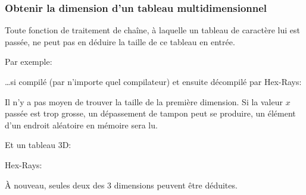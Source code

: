 \subsubsection{Obtenir la dimension d'un tableau multidimensionnel}

Toute fonction de traitement de chaîne, à laquelle un tableau de caractère lui est passée,
ne peut pas en déduire la taille de ce tableau en entrée.

Par exemple:



\dots si compilé (par n'importe quel compilateur) et ensuite décompilé par Hex-Rays:



Il n'y a pas moyen de trouver la taille de la première dimension.
Si la valeur $x$ passée est trop grosse, un dépassement de tampon peut se produire,
un élément d'un endroit aléatoire en mémoire sera lu.

Et un tableau 3D:



Hex-Rays:



À nouveau, seules deux des 3 dimensions peuvent être déduites.
